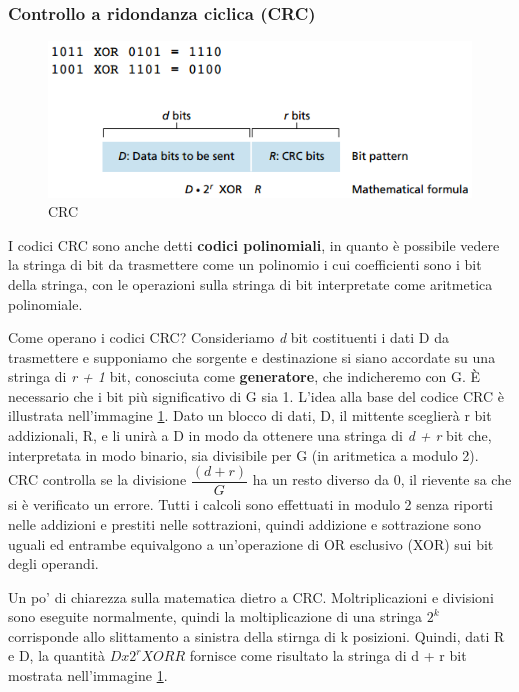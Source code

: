 \documentclass[11pt,a4paper]{article}
\begin{document}
\subsubsection{Controllo a ridondanza ciclica (CRC)} \label{par: CRC}
\begin{figure}
	\begin{center}
		\includegraphics[scale=0.6]{img/073.png}
		\caption{CRC}
		\label{fig: 073}
	\end{center}
\end{figure}
I codici CRC sono anche detti \textbf{codici polinomiali}, in quanto è possibile vedere la stringa di bit da trasmettere come un polinomio i cui coefficienti sono i bit della stringa, con le operazioni sulla stringa di bit interpretate come aritmetica polinomiale.

Come operano i codici CRC? Consideriamo \emph{d} bit costituenti i dati D da trasmettere e supponiamo che sorgente e destinazione si siano accordate su una stringa di \emph{r + 1} bit, conosciuta come \textbf{generatore}, che indicheremo con G. È necessario che i bit più significativo di G sia 1. L'idea alla base del codice CRC è illustrata nell'immagine \ref{fig: 073}. Dato un blocco di dati, D, il mittente sceglierà r bit addizionali, R,  e li unirà a D in modo da ottenere una stringa di \emph{d + r} bit che, interpretata in modo binario, sia divisibile per G (in aritmetica a modulo 2). CRC controlla se la divisione $\dfrac{(d + r)}{G}$ ha un resto diverso da 0, il rievente sa che si è verificato un errore. Tutti i calcoli sono effettuati in modulo 2 senza riporti nelle addizioni e prestiti nelle sottrazioni, quindi addizione e sottrazione sono uguali ed entrambe equivalgono a un'operazione di OR esclusivo (XOR) sui bit degli operandi.

Un po' di chiarezza sulla matematica dietro a CRC. Moltriplicazioni e divisioni sono eseguite normalmente, quindi la moltiplicazione di una stringa $2^{k}$ corrisponde allo slittamento a sinistra della stirnga di k posizioni. Quindi, dati R e D, la quantità $D x 2^{r} XOR R$ fornisce come risultato la stringa di d + r bit mostrata nell'immagine \ref{fig: 073}.
\end{document}
